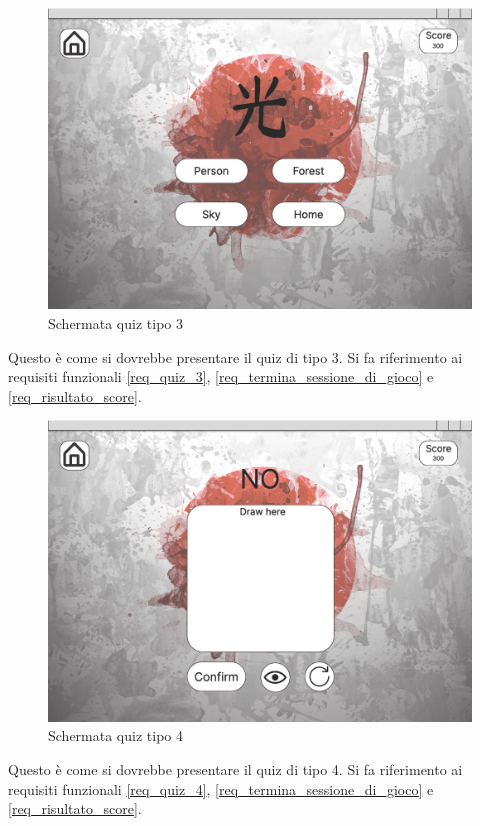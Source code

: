 \begin{figure}[!h]
\centering
\includegraphics[scale=0.35]{images/quiz_3.jpg}
\caption{Schermata quiz tipo 3}
\label{fig:schermata_quiz_3}
\end{figure}
\noindent
Questo è come si dovrebbe presentare il quiz di tipo 3. Si fa riferimento ai requisiti funzionali \ref{req_quiz_3}, \ref{req_termina_sessione_di_gioco} e \ref{req_risultato_score}.
\newpage

\begin{figure}[!h]
\centering
\includegraphics[scale=0.35]{images/quiz_4.jpg}
\caption{Schermata quiz tipo 4}
\label{fig:schermata_quiz_4}
\end{figure}
\noindent
Questo è come si dovrebbe presentare il quiz di tipo 4. Si fa riferimento ai requisiti funzionali \ref{req_quiz_4}, \ref{req_termina_sessione_di_gioco} e \ref{req_risultato_score}.

